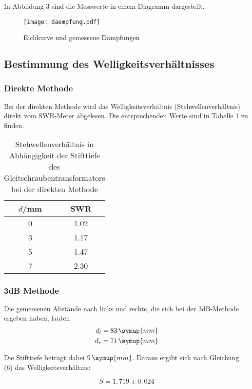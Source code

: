 In Abbildung 3 sind die Messwerte in einem Diagramm dargestellt.

\begin{figure}
  \centering
  \texttt{[image: daempfung.pdf]}
  \caption{Eichkurve und gemessene Dämpfungen}
  \label{fig:plot}
\end{figure}

\subsection{Bestimmung des Welligkeitsverhältnisses}
\subsubsection{Direkte Methode}
Bei der direkten Methode wird das Welligkeitsverhältnis (Stehwellenverhältnis) direkt
vom SWR-Meter abgelesen. Die entsprechenden Werte sind in Tabelle \ref{tab:direkt} zu finden.

\begin{table}[H]
  \centering
  \caption{Stehwellenverhältnis in Abhängigkeit der Stifttiefe des Gleitschraubentransformators bei der direkten Methode}
  \label{tab:direkt}
  \begin{tabular}{c c}
    \toprule
    $d$/mm & SWR \\
    \midrule
    0 &  1.02    \\
    3 &  1.17    \\
    5 &  1.47    \\
    7 &  2.30    \\
    \bottomrule
  \end{tabular}
\end{table}

\subsubsection{3dB Methode}
Die gemessenen Abstände nach links und rechts, die sich bei der 3dB-Methode ergeben haben,
lauten
\begin{align*}
  d_l &= 83\, \symup{mm} \\
  d_r &= 71\, \symup{mm}
\end{align*}

Die Stifttiefe beträgt dabei $9\, \symup{mm}$.
Daraus ergibt sich nach Gleichung (6) das Welligkeitsverhältnis:

\begin{equation*}
  S = 1,719 \pm 0,024
\end{equation*}

